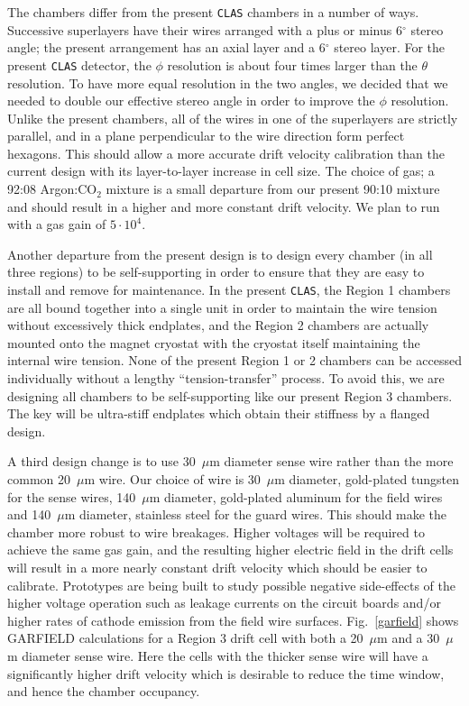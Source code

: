 The chambers differ from the present {\tt CLAS} chambers in a number of 
ways.  Successive superlayers have their wires arranged with a plus or 
minus 6$^{\circ}$ stereo angle; the present arrangement has an axial layer and 
a 6$^{\circ}$ stereo layer.  For the present {\tt CLAS} detector, the $\phi$ 
resolution is about four times larger than the $\theta$ resolution.  To 
have more equal resolution in the two angles, we decided that we needed to 
double our effective stereo angle in order to improve the  $\phi$ resolution.
Unlike the present chambers, all of the wires in one of the superlayers are
strictly parallel, and in a plane perpendicular to the wire direction form
perfect hexagons.  This should allow a more accurate drift velocity 
calibration than the current design with its layer-to-layer increase in 
cell size.  The choice of gas; a 92:08 Argon:CO$_2$ mixture is a small 
departure from our present 90:10 mixture and should result in a higher and 
more constant drift velocity.  We plan to run with a gas gain of $5\cdot10^4$.

Another departure from the present design is to design every chamber (in 
all three regions) to be self-supporting in order to ensure that they are 
easy to install and remove for maintenance.  In the present {\tt CLAS}, the 
Region 1 chambers are all bound together into a single unit in order to 
maintain the wire tension without excessively thick endplates, and the 
Region 2 chambers are actually mounted onto the magnet cryostat with the 
cryostat itself maintaining the internal wire tension.  None of the present 
Region 1 or 2 chambers can be accessed individually without a lengthy 
``tension-transfer'' process.  To avoid this, we are designing all chambers 
to be self-supporting like our present Region 3 chambers.  The key will be 
ultra-stiff endplates which obtain their stiffness by a flanged design.  

A third design change is to use 30~$\mu$m diameter sense wire rather than 
the more common 20~$\mu$m wire. Our choice of wire is 30~$\mu$m diameter, 
gold-plated tungsten for the sense wires, 140~$\mu$m diameter, gold-plated 
aluminum for the field wires and 140~$\mu$m diameter, stainless steel for
the guard wires.   This should make the chamber more robust to wire 
breakages.  Higher voltages will be required to achieve the same gas gain, 
and the resulting higher electric field in the drift cells will result in 
a more nearly constant drift velocity which should be easier to calibrate.
Prototypes are being built to study possible negative side-effects of the 
higher voltage operation such as leakage currents on the circuit boards 
and/or higher rates of cathode emission from the field wire surfaces.
Fig.~\ref{garfield} shows GARFIELD calculations for a Region 3 drift cell
with both a 20~$\mu$m and a 30~$\mu$m diameter sense wire.  Here the
cells with the thicker sense wire will have a significantly higher drift 
velocity which is desirable to reduce the time window, and hence the chamber 
occupancy.

